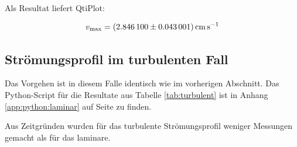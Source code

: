 Als Resultat liefert QtiPlot:

\begin{equation}
    \label{eq:profile:laminar:regression:results:vmax}
    v_{\mathrm{max}} = \SI{2.8461 \pm 0.043001}{\centi\meter\per\second}
\end{equation}

\clearpage
\subsection{Str\"omungsprofil im turbulenten Fall}
\label{subsec:profil:turbulent}

Das Vorgehen ist  in diesem Falle identisch wie im  vorherigen Abschnitt.  Das
Python-Script  f\"ur  die Resultate  aus  Tabelle  \ref{tab:turbulent} ist  in
Anhang  \ref{app:python:laminar} auf  Seite \pageref{app:python:turbulent}  zu
finden.

Aus  Zeitgr\"unden  wurden  f\"ur  das  turbulente  Str\"omungsprofil  weniger
Messungen gemacht als f\"ur das laminare.

